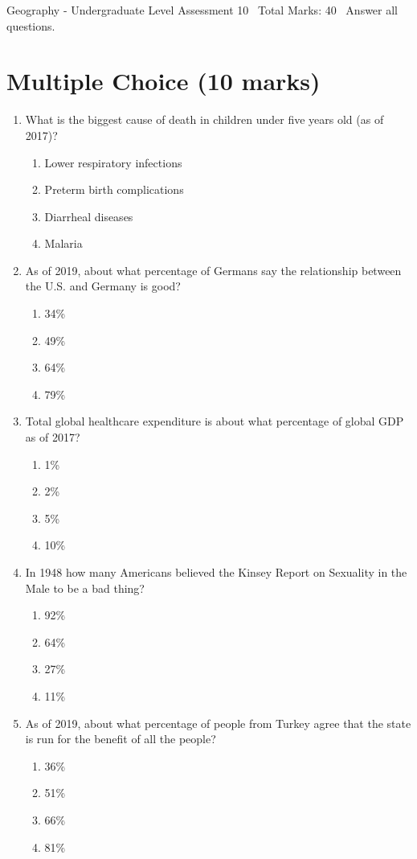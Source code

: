 \documentclass[12pt]{article}
\begin{document}
\begin{center}
Geography - Undergraduate Level Assessment 10 \
Total Marks: 40 \
Answer all questions.
\end{center}

\section*{Multiple Choice (10 marks)}
\begin{enumerate}[label=\arabic*.]
\item What is the biggest cause of death in children under five years old (as of 2017)?
\begin{enumerate}[label=(\alph*)]
    \item Lower respiratory infections
    \item Preterm birth complications
    \item Diarrheal diseases
    \item Malaria
\end{enumerate}
\item As of 2019, about what percentage of Germans say the relationship between the U.S. and Germany is good?
\begin{enumerate}[label=(\alph*)]
    \item 34\%
    \item 49\%
    \item 64\%
    \item 79\%
\end{enumerate}
\item Total global healthcare expenditure is about what percentage of global GDP as of 2017?
\begin{enumerate}[label=(\alph*)]
    \item 1\%
    \item 2\%
    \item 5\%
    \item 10\%
\end{enumerate}
\item In 1948 how many Americans believed the Kinsey Report on Sexuality in the Male to be a bad thing?
\begin{enumerate}[label=(\alph*)]
    \item 92\%
    \item 64\%
    \item 27\%
    \item 11\%
\end{enumerate}
\item As of 2019, about what percentage of people from Turkey agree that the state is run for the benefit of all the people?
\begin{enumerate}[label=(\alph*)]
    \item 36\%
    \item 51\%
    \item 66\%
    \item 81\%
\end{enumerate}
\end{enumerate}
\end{document}

